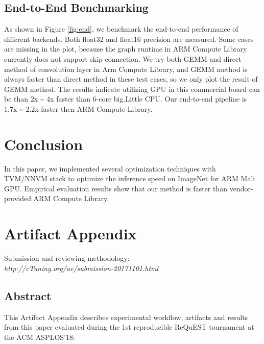 \documentclass[sigplan]{acmart}
\begin{document}
\subsection {End-to-End Benchmarking}
As shown in Figure \ref{fig:end}, we benchmark the end-to-end performance of different backends. 
Both float32 and float16 precision are measured. Some cases are missing in the plot, because the graph runtime in
 ARM Compute Library currently does not support skip connection.
We try both GEMM and direct method of convolution layer in Arm Compute Library, and GEMM method is always faster than direct method in these test cases, so we only plot the result of GEMM method. 
The results indicate utilizing GPU in this commercial board can be  than 2x \~{}  4x faster than 6-core big.Little CPU. Our end-to-end pipeline
is 1.7x \~{} 2.2x faster then ARM Compute Library.

\section{Conclusion}
In this paper, we implemented  several optimization techniques with TVM/NNVM stack to optimize the inference speed on ImageNet for ARM Mali GPU.
Empirical evaluation results show that our method is faster than vendor-provided ARM Compute Library.





\newpage

\onecolumn

\appendix
\section{Artifact Appendix}

Submission and reviewing methodology: \\
{\em http://cTuning.org/ae/submission-20171101.html}

\subsection{Abstract}

This Artifact Appendix describes experimental workflow,
artifacts and results from this paper evaluated 
during the 1st reproducible ReQuEST tournament at the ACM ASPLOS'18:
\end{document}
